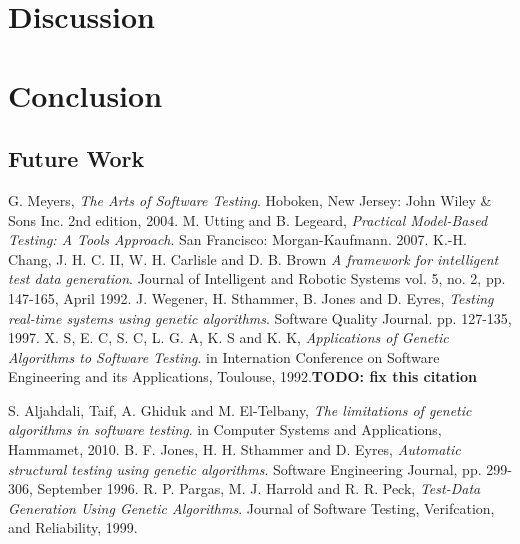 \documentclass[runningheads]{llncs}
\begin{document}
\section{Discussion}

\newpage
\section{Conclusion}

\subsection{Future Work}

\newpage
\begin{thebibliography}{9}

  G. Meyers,
  \emph{The Arts of Software Testing}.
  Hoboken, New Jersey: John Wiley \& Sons Inc.
  2nd edition,
   2004.
  M. Utting and B. Legeard,
  \emph{Practical Model-Based Testing: A Tools Approach}.
  San Francisco: Morgan-Kaufmann.
   2007.
  	K.-H. Chang, J. H. C. II, W. H. Carlisle and D. B. Brown
  \emph{A framework for intelligent test data generation}.
  Journal of Intelligent and Robotic Systems
  vol. 5, 
  no. 2, 
  pp. 147-165, 
  April 1992.
  	J. Wegener, H. Sthammer, B. Jones and D. Eyres,
  \emph{Testing real-time systems using genetic algorithms}.
  Software Quality Journal.
  pp. 127-135, 
  1997.    
  X. S, E. C, S. C, L. G. A, K. S and K. K,
  \emph{Applications of Genetic Algorithms to Software Testing}.
  in Internation Conference on Software Engineering and its Applications, 
  Toulouse, 
  1992.\textbf{TODO: fix this citation}
  
  	S. Aljahdali, Taif, A. Ghiduk and M. El-Telbany,
  \emph{The limitations of genetic algorithms in software testing}.
  in Computer Systems and Applications, 
  Hammamet, 
  2010. 
  	B. F. Jones, H. H. Sthammer and D. Eyres,
  \emph{Automatic structural testing using genetic algorithms}.
  Software Engineering Journal, 
  pp. 299-306, 
  September 1996.  
  	R. P. Pargas, M. J. Harrold and R. R. Peck,
  \emph{Test-Data Generation Using Genetic Algorithms}.
  Journal of Software Testing, Verifcation, and Reliability, 
  1999.      
\end{thebibliography}
\end{document}
